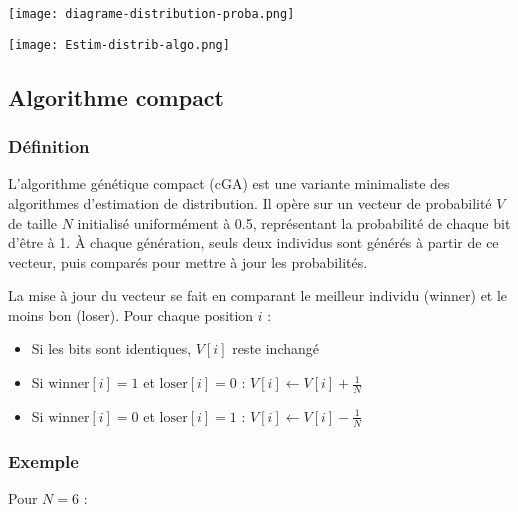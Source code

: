 \documentclass{article}
\begin{document}
\texttt{[image: diagrame-distribution-proba.png]}

\texttt{[image: Estim-distrib-algo.png]}

\subsection{Algorithme compact}
\subsubsection{Définition}
L'algorithme génétique compact (cGA) est une variante minimaliste des algorithmes d'estimation de distribution. Il opère sur un vecteur de probabilité $V$ de taille $N$ initialisé uniformément à 0.5, représentant la probabilité de chaque bit d'être à 1. À chaque génération, seuls deux individus sont générés à partir de ce vecteur, puis comparés pour mettre à jour les probabilités.

La mise à jour du vecteur se fait en comparant le meilleur individu (winner) et le moins bon (loser). Pour chaque position $i$ :
\begin{itemize}
    \item Si les bits sont identiques, $V[i]$ reste inchangé
    \item Si $\text{winner}[i] = 1$ et $\text{loser}[i] = 0$ : $V[i] \leftarrow V[i] + \frac{1}{N}$
    \item Si $\text{winner}[i] = 0$ et $\text{loser}[i] = 1$ : $V[i] \leftarrow V[i] - \frac{1}{N}$
\end{itemize}

\subsubsection{Exemple}
Pour $N = 6$ :
\end{document}
